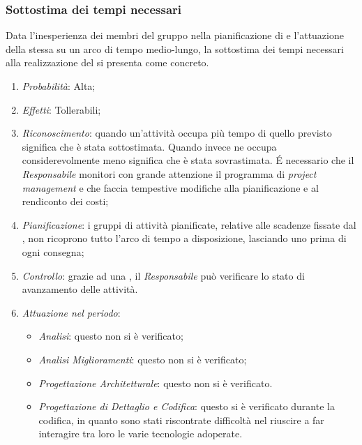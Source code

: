 \subsubsection{Sottostima dei tempi necessari}
Data l'inesperienza dei membri del gruppo nella pianificazione di  e l'attuazione della stessa su un arco di tempo medio-lungo, la sottostima dei tempi necessari alla realizzazione del  si presenta come  concreto.
\begin{enumerate}
\item \textit{Probabilit\`a}: Alta;
\item \textit{Effetti}: Tollerabili;
\item \textit{Riconoscimento}: quando un’attività occupa più tempo di quello previsto significa che è stata sottostimata. Quando invece ne occupa considerevolmente meno significa che è stata sovrastimata. É necessario che il \textit{Responsabile} monitori con grande attenzione il programma di \textit{project management} e che faccia tempestive modifiche alla pianificazione e al rendiconto dei costi;
\item \textit{Pianificazione}: i gruppi di attivit\`a pianificate, relative alle scadenze fissate dal , non ricoprono tutto l'arco di tempo a disposizione, lasciando uno  prima di ogni consegna;
\item \textit{Controllo}: grazie ad una , il \textit{Responsabile} pu\`o verificare lo stato di avanzamento delle attivit\`a.
\item \textit{Attuazione nel periodo}: 
	\begin{itemize}
	\item \textit{Analisi}: questo  non si è verificato;
	\item \textit{Analisi Miglioramenti}: questo  non si è verificato;
	\item \textit{Progettazione Architetturale}: questo  non si è verificato.
	\item \textit{Progettazione di Dettaglio e Codifica}: questo  si \`e verificato durante la codifica, in quanto sono stati riscontrate difficolt\`a nel riuscire a far interagire tra loro le varie tecnologie adoperate.
	\end{itemize}
\end{enumerate}

